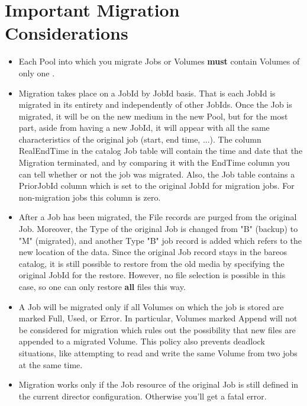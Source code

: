 \section{Important Migration Considerations}
\begin{itemize}
\item Each Pool into which you migrate Jobs or Volumes {\bf must}
      contain Volumes of only one .

\item Migration takes place on a JobId by JobId basis. That is
      each JobId is migrated in its entirety and independently
      of other JobIds. Once the Job is migrated, it will be
      on the new medium in the new Pool, but for the most part,
      aside from having a new JobId, it will appear with all the
      same characteristics of the original job (start, end time, ...).
      The column RealEndTime in the catalog Job table will contain the
      time and date that the Migration terminated, and by comparing
      it with the EndTime column you can tell whether or not the
      job was migrated. Also, the Job table contains a PriorJobId
      column which is set to the original JobId for migration jobs. For
      non-migration jobs this column is zero.

\item After a Job has been migrated, the File records are purged from
      the original Job. Moreover, the Type of the original Job is
      changed from "B" (backup) to "M" (migrated), and another Type
      "B" job record is added which refers to the new location of the
      data. Since the original Job record stays in the bareos catalog,
      it is still possible to restore from the old media by specifying
      the original JobId for the restore. However, no file selection is
      possible in this case, so one can only restore {\bf all} files
      this way.

\item A Job will be migrated only if all Volumes on which the job
      is stored are marked Full, Used, or Error. In particular, Volumes
      marked Append will not be considered for migration which rules out
      the possibility that new files are appended to a migrated Volume.
      This policy also prevents deadlock situations, like attempting to
      read and write the same Volume from two jobs at the same time.

\item Migration works only if the Job resource of the original Job is
      still defined in the current director configuration. Otherwise
      you'll get a fatal error.


\end{itemize}
